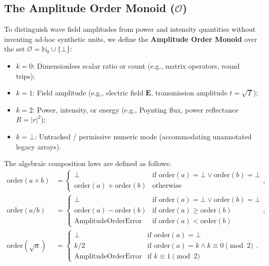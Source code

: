 \documentclass[preprint,12pt]{elsarticle}
\begin{document}
\subsection{The Amplitude Order Monoid \texorpdfstring{($\mathcal{O}$)}{(O)}}

To distinguish wave field amplitudes from power and intensity quantities without inventing ad-hoc synthetic units, we define the \textbf{Amplitude Order Monoid} over the set $\mathcal{O} = \mathbb{N}_0 \cup \{\bot\}$:
\begin{itemize}
    \item $k = 0$: Dimensionless scalar ratio or count (e.g., matrix operators, round trips);
    \item $k = 1$: Field amplitude (e.g., electric field $\mathbf{E}$, transmission amplitude $t = \sqrt{T}$);
    \item $k = 2$: Power, intensity, or energy (e.g., Poynting flux, power reflectance $R = |r|^2$);
    \item $k = \bot$: Untracked / permissive numeric mode (accommodating unannotated legacy arrays).
\end{itemize}

The algebraic composition laws are defined as follows:
\begin{align}
\text{order}(a \times b) &= \begin{cases} \bot & \text{if } \text{order}(a) = \bot \lor \text{order}(b) = \bot \\ \text{order}(a) + \text{order}(b) & \text{otherwise} \end{cases}, \\
\text{order}(a / b) &= \begin{cases} \bot & \text{if } \text{order}(a) = \bot \lor \text{order}(b) = \bot \\ \text{order}(a) - \text{order}(b) & \text{if } \text{order}(a) \ge \text{order}(b) \\ \text{AmplitudeOrderError} & \text{if } \text{order}(a) < \text{order}(b) \end{cases}, \\
\text{order}(\sqrt{a}) &= \begin{cases} \bot & \text{if } \text{order}(a) = \bot \\ k / 2 & \text{if } \text{order}(a) = k \land k \equiv 0 \pmod 2 \\ \text{AmplitudeOrderError} & \text{if } k \equiv 1 \pmod 2 \end{cases}.
\end{align}
\end{document}
